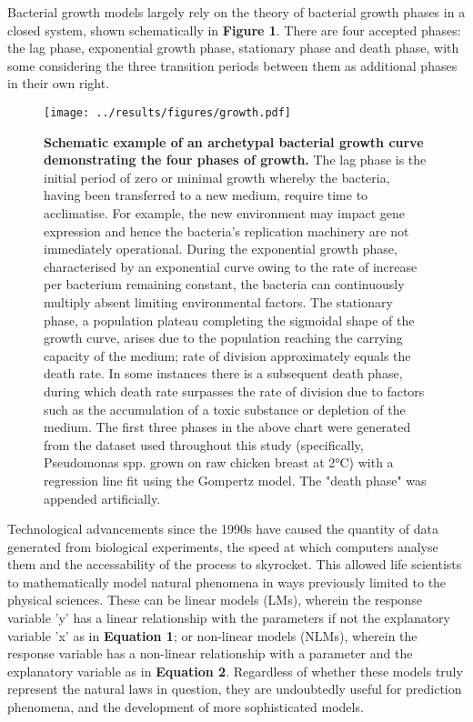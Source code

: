\documentclass[11pt]{article}
\begin{document}
Bacterial growth models largely rely on the theory of bacterial growth phases in a closed system, shown schematically in \textbf{Figure 1}. There are four accepted phases: the lag phase, exponential growth phase, stationary phase and death phase, with some considering the three transition periods between them as additional phases in their own right.\parencite{Buchanan1918}


\vspace{5mm}
\begin{figure}[htb]
    \centering
    \texttt{[image: ../results/figures/growth.pdf]}
    \caption{\textbf{Schematic example of an archetypal bacterial growth curve demonstrating the four phases of growth.}  The lag phase is the initial period of zero or minimal growth whereby the bacteria, having been transferred to a new medium, require time to acclimatise. For example, the new environment may impact gene expression and hence the bacteria's replication machinery are not immediately operational.\parencite{Buchanan1918} During the exponential growth phase, characterised by an exponential curve owing to the rate of increase per bacterium remaining constant, the bacteria can continuously multiply absent limiting environmental factors.\parencite{Micha2011} The stationary phase, a population plateau completing the sigmoidal shape of the growth curve, arises due to the population reaching the carrying capacity of the medium; rate of division approximately equals the death rate.\parencite{Buchanan1918} In some instances there is a subsequent death phase, during which death rate surpasses the rate of division due to factors such as the accumulation of a toxic substance or depletion of the medium.\parencite{Micha2011, Buchanan1918}
    The first three phases in the above chart were generated from the dataset used throughout this study (specifically, Pseudomonas spp. grown on raw chicken breast at 2°C) with a regression line fit using the Gompertz model. The "death phase" was appended artificially.}
\end{figure}
\vspace{5mm}

Technological advancements since the 1990s have caused the quantity of data generated from biological experiments, the speed at which computers analyse them and the accessability of the process to skyrocket. This allowed life scientists to mathematically model natural phenomena in ways previously limited to the physical sciences.\parencite{Bolker2013,Johnson2004} These can be linear models (LMs), wherein the response variable 'y' has a linear relationship with the parameters if not the explanatory variable 'x' as in \textbf{Equation 1}; or non-linear models (NLMs), wherein the response variable has a non-linear relationship with a parameter and the explanatory variable as in \textbf{Equation 2}.\parencite{Bolker2013} Regardless of whether these models truly represent the natural laws in question, they are undoubtedly useful for prediction phenomena, and the development of more sophisticated models.\parencite{Transtrum2016}
\end{document}

